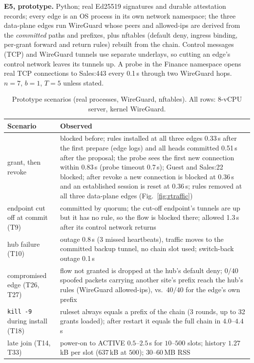\documentclass[conference]{IEEEtran}
\begin{document}
\textbf{E5, prototype.} Python; real Ed25519 signatures and durable attestation records; every edge is an OS process in its own network namespace; the three data-plane edges run WireGuard whose peers and allowed-ips are derived from the \emph{committed} paths and prefixes, plus nftables (default deny, ingress binding, per-grant forward and return rules) rebuilt from the chain. Control messages (TCP) and WireGuard tunnels use separate underlays, so cutting an edge's control network leaves its tunnels up. A probe in the Finance namespace opens real TCP connections to Sales:443 every 0.1\,s through two WireGuard hops. $n{=}7$, $b{=}1$, $T{=}5$ unless stated.
\begin{table}[t]
\centering\caption{Prototype scenarios (real processes, WireGuard, nftables). All rows: 8-vCPU server, kernel WireGuard.}\label{tab:proto}
\scriptsize
\begin{tabular}{@{}p{2.45cm}p{5.3cm}@{}}
\toprule
Scenario & Observed\\
\midrule
grant, then revoke & blocked before; rules installed at all three edges 0.33\,s after the first prepare (edge logs) and all heads committed 0.51\,s after the proposal; the probe sees the first new connection within 0.83\,s (probe timeout 0.7\,s); Guest and Sales:22 blocked; after revoke a new connection is blocked at 0.36\,s and an established session is reset at 0.36\,s; rules removed at all three data-plane edges (Fig.~\ref{fig:rtraffic})\\
endpoint cut off at commit (T9) & committed by quorum; the cut-off endpoint's tunnels are up but it has no rule, so the flow is blocked there; allowed 1.3\,s after its control network returns\\
hub failure (T10) & outage 0.8\,s (3 missed heartbeats), traffic moves to the committed backup tunnel, no chain slot used; switch-back outage 0.1\,s\\
compromised edge (T26, T27) & flow not granted is dropped at the hub's default deny; $0/40$ spoofed packets carrying another site's prefix reach the hub's rules (WireGuard allowed-ips), vs.\ $40/40$ for the edge's own prefix\\
\texttt{kill -9} during install (T18) & ruleset always equals a prefix of the chain (3 rounds, up to 32 grants loaded); after restart it equals the full chain in $4.0$--$4.4$\,s\\
late join (T14, T33) & power-on to ACTIVE $0.5$--$2.5$\,s for $10$--$500$ slots; history $1.27$\,kB per slot ($637$\,kB at $500$); $30$--$60$\,MB RSS\\

\end{tabular}
\end{table}
\end{document}
